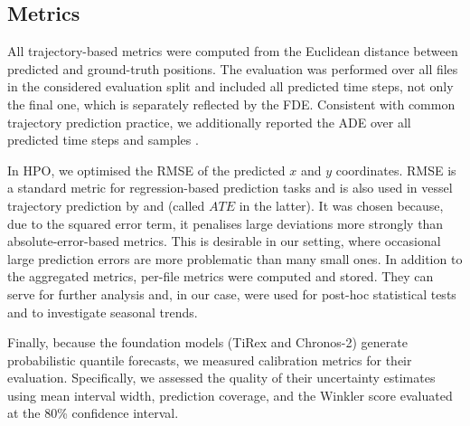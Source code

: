             

    \subsection{Metrics}
    All trajectory-based metrics were computed from the Euclidean distance between predicted and ground-truth positions. The evaluation was performed over all files in the considered evaluation split and included all predicted time steps, not only the final one, which is separately reflected by the \acf{FDE}. Consistent with common trajectory prediction practice, we additionally reported the \acf{ADE} over all predicted time steps and samples \parencite{donandt2022shortterm, articlebilstmsus}.
    
    In \ac{HPO}, we optimised the \acf{RMSE} of the predicted $x$ and $y$ coordinates. \ac{RMSE} is a standard metric for regression-based prediction tasks and is also used in vessel trajectory prediction by \textcite{articlebilstmsus} and \textcite{donandt2022shortterm} (called $ATE$ in the latter). %
    It was chosen because, due to the squared error term, it penalises large deviations more strongly than absolute-error-based metrics. This is desirable in our setting, where occasional large prediction errors are more problematic than many small ones.
    In addition to the aggregated metrics, per-file metrics were computed and stored. %
    They can serve for further analysis and, in our case, were used for post-hoc statistical tests and to investigate seasonal trends.
    
    Finally, because the foundation models (TiRex and Chronos-2) generate probabilistic quantile forecasts, we measured calibration metrics for their evaluation. Specifically, we assessed the quality of their uncertainty estimates using mean interval width, prediction coverage, and the Winkler score evaluated at the 80\% confidence interval.


